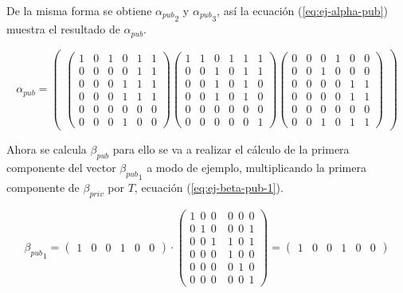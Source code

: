 De la misma forma se obtiene ${\alpha_{pub}}_2$ y ${\alpha_{pub}}_3$, así la ecuación (\ref{eq:ej-alpha-pub}) muestra el resultado de $\alpha_{pub}$.


\begin{equation}\label{eq:ej-alpha-pub}
{\alpha_{pub}} = 
	\left(\begin{matrix}
	\left(\begin{smallmatrix}
		1 & 0 & 1 & 0 & 1 & 1\\
		0 & 0 & 0 & 0 & 1 & 1\\
		0 & 0 & 0 & 1 & 1 & 1\\
		0 & 0 & 0 & 1 & 1 & 1\\
		0 & 0 & 0 & 0 & 0 & 0\\
		0 & 0 & 0 & 1 & 0 & 0
	\end{smallmatrix}\right)
		
	\left(\begin{smallmatrix}
		1 & 1 & 0 & 1 & 1 & 1\\
		0 & 0 & 1 & 0 & 1 & 1\\
		0 & 0 & 1 & 0 & 1 & 0\\
		0 & 0 & 1 & 0 & 1 & 0\\
		0 & 0 & 0 & 0 & 0 & 0\\
		0 & 0 & 0 & 0 & 0 & 1
	\end{smallmatrix}\right)
	
	\left(\begin{smallmatrix}
		0 & 0 & 0 & 1 & 0 & 0\\
		0 & 0 & 1 & 0 & 0 & 0\\
		0 & 0 & 0 & 0 & 1 & 1\\
		0 & 0 & 0 & 0 & 1 & 1\\
		0 & 0 & 0 & 0 & 0 & 0\\
		0 & 0 & 1 & 0 & 1 & 1
	\end{smallmatrix}\right)
	\end{matrix}\right)
\end{equation}


Ahora se calcula $\beta_{pub}$ para ello se va a realizar el cálculo de la primera componente del vector ${\beta_{pub}}_1$ a modo de ejemplo, multiplicando la primera componente de $\beta_{priv}$ por $T$, ecuación (\ref{eq:ej-beta-pub-1}).

\begin{equation}\label{eq:ej-beta-pub-1}
	{{\beta_{pub}}_1} = 
	\left(\begin{matrix}1 & 0 & 0 & 1 & 0 & 0\end{matrix}\right) \cdot
	\left(\begin{array}{c|c}
		1\ \ 0\ \ 0\ & 0\ \ 0\ \ 0\\
		0\ \ 1\ \ 0\ & 0\ \ 0\ \ 1\\
		0\ \ 0\ \ 1\ & 1\ \ 0\ \ 1\\
		\hline
		0\ \ 0\ \ 0\ & 1\ \ 0\ \ 0\\
		0\ \ 0\ \ 0\ & 0\ \ 1\ \ 0\\
		0\ \ 0\ \ 0\ & 0\ \ 0\ \ 1
	\end{array}\right) =
	\left(\begin{matrix}1 & 0 & 0 & 1 & 0 & 0\end{matrix}\right)
\end{equation}

